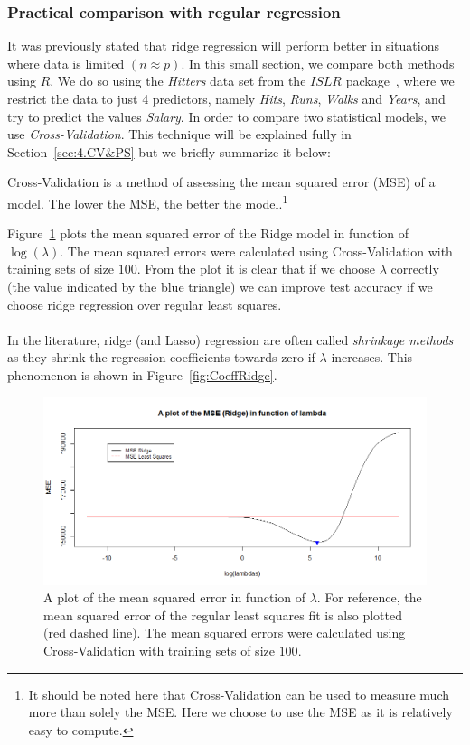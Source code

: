 \subsubsection{Practical comparison with regular regression} \label{sec:PractRidgeComparison}
It was previously stated that ridge regression will perform better in situations where data is limited $(n \approx p)$. In this small section, we compare both methods using $R$. We do so using the \textit{Hitters} data set from the $ISLR$ package~\cite{ISL2013}, where we restrict the data to just 4 predictors, namely \textit{Hits}, \textit{Runs}, \textit{Walks} and \textit{Years}, and try to predict the values \textit{Salary}. In order to compare two statistical models, we use \textit{Cross-Validation}. This technique will be explained fully in Section~\ref{sec:4.CV&PS} but we briefly summarize it below:
\begin{center}
    Cross-Validation is a method of assessing the mean squared error (MSE) of a model. The lower the MSE, the better the model.\footnote{It should be noted here that Cross-Validation can be used to measure much more than solely the MSE. Here we choose to use the MSE as it is relatively easy to compute.}
\end{center}

Figure~\ref{fig:RidgeVSLSS} plots the mean squared error of the Ridge model in function of $\log(\lambda)$. The mean squared errors were calculated using Cross-Validation with training sets of size $100$. From the plot it is clear that if we choose $\lambda$ correctly (the value indicated by the blue triangle) we can improve test accuracy if we choose ridge regression over regular least squares.\\
\\
In the literature, ridge (and Lasso) regression are often called \textit{shrinkage methods} as they shrink the regression coefficients towards zero if $\lambda$ increases. This phenomenon is shown in Figure~\ref{fig:CoeffRidge}. 

\begin{figure}
    \centering
    \includegraphics[width=\linewidth]{Figures/RidgeVSLSS.png}
    \caption{A plot of the mean squared error in function of $\lambda$. For reference, the mean squared error of the regular least squares fit is also plotted (red dashed line). The mean squared errors were calculated using Cross-Validation with training sets of size $100$.}
    \label{fig:RidgeVSLSS}
\end{figure}

